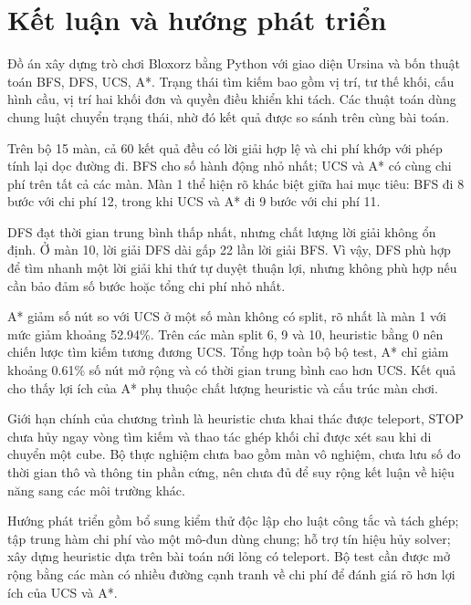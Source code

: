 \clearpage
\section{Kết luận và hướng phát triển}
Đồ án xây dựng trò chơi Bloxorz bằng Python với giao diện Ursina và bốn thuật toán BFS, DFS, UCS, A*. Trạng thái tìm kiếm bao gồm vị trí, tư thế khối, cấu hình cầu, vị trí hai khối đơn và quyền điều khiển khi tách. Các thuật toán dùng chung luật chuyển trạng thái, nhờ đó kết quả được so sánh trên cùng bài toán.

Trên bộ 15 màn, cả 60 kết quả đều có lời giải hợp lệ và chi phí khớp với phép tính lại dọc đường đi. BFS cho số hành động nhỏ nhất; UCS và A* có cùng chi phí trên tất cả các màn. Màn 1 thể hiện rõ khác biệt giữa hai mục tiêu: BFS đi 8 bước với chi phí 12, trong khi UCS và A* đi 9 bước với chi phí 11.

DFS đạt thời gian trung bình thấp nhất, nhưng chất lượng lời giải không ổn định. Ở màn 10, lời giải DFS dài gấp 22 lần lời giải BFS. Vì vậy, DFS phù hợp để tìm nhanh một lời giải khi thứ tự duyệt thuận lợi, nhưng không phù hợp nếu cần bảo đảm số bước hoặc tổng chi phí nhỏ nhất.

A* giảm số nút so với UCS ở một số màn không có split, rõ nhất là màn 1 với mức giảm khoảng 52.94\%. Trên các màn split 6, 9 và 10, heuristic bằng 0 nên chiến lược tìm kiếm tương đương UCS. Tổng hợp toàn bộ bộ test, A* chỉ giảm khoảng 0.61\% số nút mở rộng và có thời gian trung bình cao hơn UCS. Kết quả cho thấy lợi ích của A* phụ thuộc chất lượng heuristic và cấu trúc màn chơi.

Giới hạn chính của chương trình là heuristic chưa khai thác được teleport, STOP chưa hủy ngay vòng tìm kiếm và thao tác ghép khối chỉ được xét sau khi di chuyển một cube. Bộ thực nghiệm chưa bao gồm màn vô nghiệm, chưa lưu số đo thời gian thô và thông tin phần cứng, nên chưa đủ để suy rộng kết luận về hiệu năng sang các môi trường khác.

Hướng phát triển gồm bổ sung kiểm thử độc lập cho luật công tắc và tách ghép; tập trung hàm chi phí vào một mô-đun dùng chung; hỗ trợ tín hiệu hủy solver; xây dựng heuristic dựa trên bài toán nới lỏng có teleport. Bộ test cần được mở rộng bằng các màn có nhiều đường cạnh tranh về chi phí để đánh giá rõ hơn lợi ích của UCS và A*.
